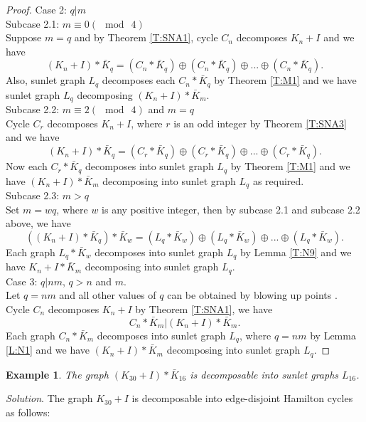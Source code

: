 \documentclass[12pt]{report}
\newtheorem{exm}[thm]{Example}
\begin{document}
\begin{proof}
Case 2: $q|m$\\
Subcase 2.1: $m\equiv 0(\mod\ 4)$\\
Suppose $m=q$ and by Theorem \ref{T:SNA1}, cycle $C_n$ decomposes
$K_n+I$ and we have $$(K_ n+I)*\bar{K}_q=(C_n*\bar{K}_q)\oplus
(C_n*\bar{K}_q)\oplus. . .\oplus (C_n*\bar{K}_q).$$
Also, sunlet graph $L_q$ decomposes each $C_n*\bar{K}_q$ by Theorem \ref{T:M1} and  we have sunlet graph $L_q$ decomposing $(K_n+I)*\bar{K}_m$.\\
Subcase 2.2: $m\equiv 2(\mod\ 4)$ and $m=q$\\
Cycle $C_r$ decomposes $K_n+I$, where $r$ is an odd integer by
Theorem \ref{T:SNA3} and we have
$$(K_ n+I)*\bar{K}_q=(C_r*\bar{K}_q)\oplus (C_r*\bar{K}_q)\oplus. . .\oplus (C_r*\bar{K}_q).$$
Now each $C_r*\bar{K}_q$ decomposes into sunlet graph $L_q$ by
Theorem \ref{T:M1} and  we have
$(K_n+I)*\bar{K}_m$ decomposing into sunlet graph $L_q$ as required.\\
Subcase 2.3: $m>q$\\
Set  $m=wq$, where $w$ is any positive integer, then by subcase 2.1
and  subcase 2.2 above, we have
$$((K_ n+I)*\bar{K}_q)*\bar{K}_w=(L_q*\bar{K}_w)\oplus (L_q*\bar{K}_w)\oplus. . .\oplus (L_q*\bar{K}_w).$$
Each graph $L_q*\bar{K}_w$ decomposes into sunlet graph $L_q$ by
Lemma \ref{T:N9} and we have $K_n+I*\bar{K}_m$ decomposing into
sunlet graph $L_q$.\\
Case 3: $q|nm$, $q>n$ and $m$.\\
Let $q=nm$ and all other values of $q$ can be obtained by blowing up
points . Cycle $C_n$ decomposes $K_n+I$ by Theorem \ref{T:SNA1}, we
have $$C_n*\bar{K}_m|(K_n+I)*\bar{K}_m.$$ Each graph $C_n*\bar{K}_m$
decomposes into sunlet graph $L_q$, where $q=nm$ by Lemma \ref{L:N1}
and we have $(K_n+I)*\bar{K}_m$ decomposing into sunlet graph $L_q$.
\end{proof}
\begin{exm}
The graph $(K_{30}+I)*\bar{K}_{16}$ is decomposable into sunlet
graphs $L_{16}$.
\end{exm}
{\em Solution}. The graph $K_{30}+I$ is decomposable into
edge-disjoint Hamilton cycles as follows:
\end{document}
